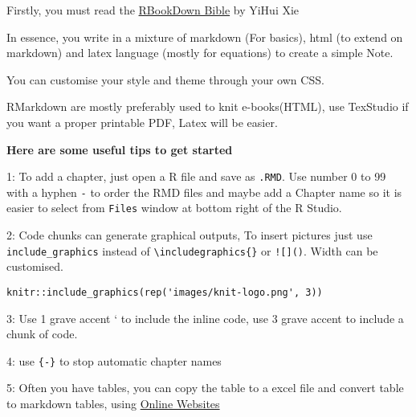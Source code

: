 \documentclass[
]{book}
\begin{document}
Firstly, you must read the \href{https://bookdown.org/yihui/bookdown/}{RBookDown Bible} by YiHui Xie

In essence, you write in a mixture of markdown (For basics), html (to extend on markdown) and latex language (mostly for equations) to create a simple Note.

You can customise your style and theme through your own CSS.

RMarkdown are mostly preferably used to knit e-books(HTML), use TexStudio if you want a proper printable PDF, Latex will be easier.

\textbf{Here are some useful tips to get started}

1: To add a chapter, just open a R file and save as \texttt{.RMD}. Use number 0 to 99 with a hyphen \texttt{-} to order the RMD files and maybe add a Chapter name so it is easier to select from \texttt{Files} window at bottom right of the R Studio.

2: Code chunks can generate graphical outputs, To insert pictures just use \texttt{include\_graphics} instead of \texttt{\textbackslash{}includegraphics\{\}} or \texttt{!{[}{]}()}. Width can be customised.

\begin{verbatim}
knitr::include_graphics(rep('images/knit-logo.png', 3))
\end{verbatim}

3: Use 1 grave accent ` to include the inline code, use 3 grave accent to include a chunk of code.

4: use \texttt{\{-\}} to stop automatic chapter names

5: Often you have tables, you can copy the table to a excel file and convert table to markdown tables, using \href{https://www.tablesgenerator.com/markdown_tables}{Online Websites}

  
\end{document}
